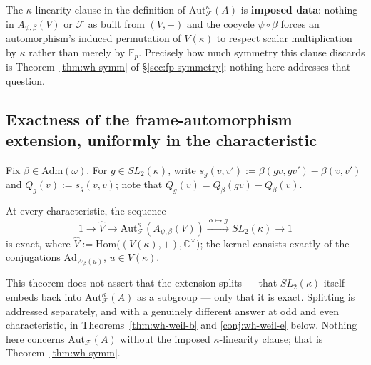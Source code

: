 \begin{scope}
The $\kappa$-linearity clause in the definition of
$\mathrm{Aut}_{\mathcal{F}}^\kappa(A)$ is \textbf{imposed data}: nothing in
$A_{\psi,\beta}(V)$ or $\mathcal{F}$ as built from $(V,+)$ and the cocycle
$\psi\circ\beta$ forces an automorphism's induced permutation of $V(\kappa)$
to respect scalar multiplication by $\kappa$ rather than merely by
$\mathbb{F}_p$. Precisely how much symmetry this clause discards is
Theorem~\ref{thm:wh-symm} of \S\ref{sec:fp-symmetry}; nothing here
addresses that question.
\end{scope}


\subsection{Exactness of the frame-automorphism extension, uniformly in the
characteristic}

Fix $\beta\in\mathrm{Adm}(\omega)$. For $g\in SL_2(\kappa)$, write
$s_g(v,v') := \beta(gv,gv')-\beta(v,v')$ and $Q_g(v):=s_g(v,v)$; note that
$Q_g(v)=Q_\beta(gv)-Q_\beta(v)$.

\statusProved
\begin{theorem}
\label{thm:wh-weil-a}
At every characteristic, the sequence
\[
1 \longrightarrow \hat V \longrightarrow \mathrm{Aut}_{\mathcal{F}}^\kappa(A_{\psi,\beta}(V))
\xrightarrow{\ \alpha\mapsto g\ } SL_2(\kappa) \longrightarrow 1
\]
is exact, where $\hat V := \mathrm{Hom}\big((V(\kappa),+),\mathbb{C}^\times\big)$; the
kernel consists exactly of the conjugations $\mathrm{Ad}_{W_\beta(u)}$,
$u\in V(\kappa)$.
\end{theorem}

\begin{scope}
This theorem does not assert that the extension splits — that $SL_2(\kappa)$
itself embeds back into $\mathrm{Aut}_{\mathcal{F}}^\kappa(A)$ as a
subgroup — only that it is exact. Splitting is addressed separately, and
with a genuinely different answer at odd and even characteristic, in
Theorems~\ref{thm:wh-weil-b} and \ref{conj:wh-weil-e} below. Nothing here
concerns $\mathrm{Aut}_{\mathcal{F}}(A)$ without the imposed $\kappa$-linearity
clause; that is Theorem~\ref{thm:wh-symm}.
\end{scope}


